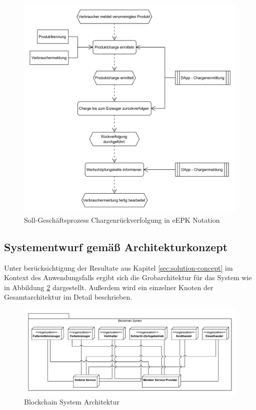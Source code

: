 \begin{figure}[H]
	\centering
	\includegraphics[width=0.92\linewidth]{pictures/business-process-target-epc-diagram-bw}
	\caption[Soll-Geschäftsprozess Chargenrückverfolgung]{Soll-Geschäftsprozess Chargenrückverfolgung in eEPK Notation}
	\label{fig:target-business-process}
\end{figure}

\subsection{Systementwurf gemäß Architekturkonzept}\label{system-design-concept}
Unter berücksichtigung der Resultate aus Kapitel \ref{sec:solution-concept} im Kontext des Anwendungsfalls ergibt sich die Grobarchitektur für das System wie in Abbildung \ref{fig:blockchain-system-architecture} dargestellt. Außerdem wird ein einzelner Knoten der Gesamtarchitektur im Detail beschrieben.

\begin{figure}[H]
	\centering
	\includegraphics[width=1\linewidth]{pictures/blockchain-system-deployment-diagram}
	\caption[Blockchain System Architektur]{Blockchain System Architektur}
	\label{fig:blockchain-system-architecture}
\end{figure}

